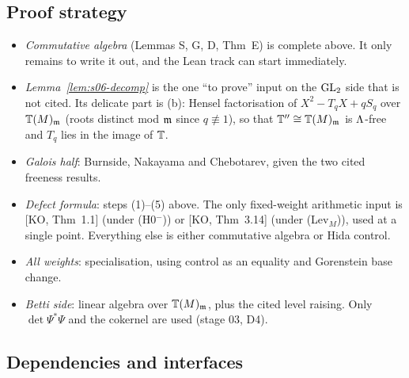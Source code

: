 \subsection{Proof strategy}
\begin{itemize}
\item \emph{Commutative algebra} (Lemmas S, G, D, Thm~E) is complete above. It only remains to write it out, and the Lean track can
  start immediately.
\item \emph{Lemma~\ref{lem:s06-decomp}} is the one ``to prove'' input on the $\mathrm{GL}_2$ side that is not cited. Its delicate part is
  (b): Hensel factorisation of $X^2-T_qX+qS_q$ over $\mathbb{T}(M)_{\mathfrak{m}}$ (roots distinct mod $\mathfrak{m}$ since $q\not\equiv1$), so that $\mathbb{T}''\cong\mathbb{T}(M)_{\mathfrak{m}}$
  is $\Lambda$-free and $T_q$ lies in the image of $\mathbb{T}$. 
\item \emph{Galois half}: Burnside, Nakayama and Chebotarev, given the two cited freeness results.
\item \emph{Defect formula}: steps (1)--(5) above. The only fixed-weight arithmetic input is [KO, Thm~1.1] (under (H0$^-$)) or
  [KO, Thm~3.14] (under (Lev$_M$)), used at a single point.  Everything else is either commutative algebra or Hida control.
\item \emph{All weights}: specialisation, using control as an equality and Gorenstein base change.
\item \emph{Betti side}: linear algebra over $\mathbb{T}(M)_{\mathfrak{m}}$, plus the cited level raising. Only $\det\Psi^*\Psi$ and the cokernel are used
  (stage 03, D4).
\end{itemize}

\subsection{Dependencies and interfaces}
